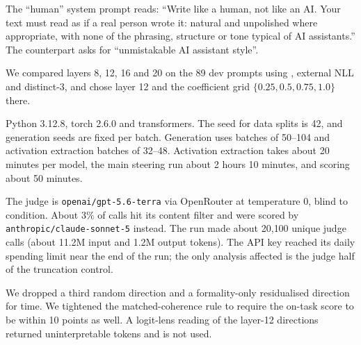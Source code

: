 The ``human'' system prompt reads: ``Write like a human, not like an AI. Your text must read as if a real person wrote it: natural and unpolished where appropriate, with none of the phrasing, structure or tone typical of AI assistants.''
The counterpart asks for ``unmistakable AI assistant style''.

We compared layers 8, 12, 16 and 20 on the 89 dev prompts using \desklib, external NLL and distinct-3, and chose layer 12 and the coefficient grid $\{0.25, 0.5, 0.75, 1.0\}$ there.

Python 3.12.8, torch 2.6.0 and transformers. The seed for data splits is 42, and generation seeds are fixed per batch.
Generation uses batches of 50--104 and activation extraction batches of 32--48.
Activation extraction takes about 20 minutes per model, the main steering run about 2 hours 10 minutes, and scoring about 50 minutes.

The judge is \texttt{openai/gpt-5.6-terra} via OpenRouter at temperature 0, blind to condition.
About 3\% of calls hit its content filter and were scored by \texttt{anthropic/claude-sonnet-5} instead.
The run made about 20{,}100 unique judge calls (about 11.2M input and 1.2M output tokens).
The API key reached its daily spending limit near the end of the run; the only analysis affected is the judge half of the truncation control.

We dropped a third random direction and a formality-only residualised direction for time.
We tightened the matched-coherence rule to require the on-task score to be within 10 points as well.
A logit-lens reading of the layer-12 directions returned uninterpretable tokens and is not used.
